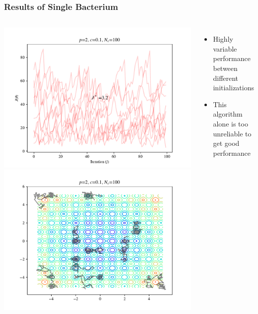 \documentclass{beamer}
\begin{document}
\begin{frame}
\frametitle{Results of Single Bacterium}
\begin{columns}[T]
    \begin{center}
      \includegraphics[scale=0.3]{assets/rastrigin_J}
      \includegraphics[scale=0.3]{assets/rastrigin_theta}
    \end{center}
    \begin{itemize}
      \item Highly variable performance between different initializations
      \item This algorithm alone is too unreliable to get good performance
    \end{itemize}
\end{columns}
\end{frame}
\end{document}
